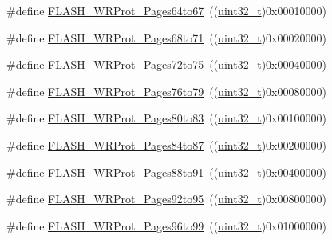 \begin{DoxyCompactItemize}
\item 
\#define \hyperlink{group___option___bytes___write___protection_ga124928d6134ddac13e3e8810a0d8dd1a}{F\+L\+A\+S\+H\+\_\+\+W\+R\+Prot\+\_\+\+Pages64to67}~((\hyperlink{_p_e___types_8h_a33594304e786b158f3fb30289278f5af}{uint32\+\_\+t})0x00010000)
\item 
\#define \hyperlink{group___option___bytes___write___protection_gafbb813885c6cd505c64083f2f88532fb}{F\+L\+A\+S\+H\+\_\+\+W\+R\+Prot\+\_\+\+Pages68to71}~((\hyperlink{_p_e___types_8h_a33594304e786b158f3fb30289278f5af}{uint32\+\_\+t})0x00020000)
\item 
\#define \hyperlink{group___option___bytes___write___protection_ga1a19c52012bbb30f3ae1599fa5a200cc}{F\+L\+A\+S\+H\+\_\+\+W\+R\+Prot\+\_\+\+Pages72to75}~((\hyperlink{_p_e___types_8h_a33594304e786b158f3fb30289278f5af}{uint32\+\_\+t})0x00040000)
\item 
\#define \hyperlink{group___option___bytes___write___protection_ga9e1f9abfa57766312c6cbae9b42f3ab6}{F\+L\+A\+S\+H\+\_\+\+W\+R\+Prot\+\_\+\+Pages76to79}~((\hyperlink{_p_e___types_8h_a33594304e786b158f3fb30289278f5af}{uint32\+\_\+t})0x00080000)
\item 
\#define \hyperlink{group___option___bytes___write___protection_ga5749428874f99f77a5c5fc48a88816d9}{F\+L\+A\+S\+H\+\_\+\+W\+R\+Prot\+\_\+\+Pages80to83}~((\hyperlink{_p_e___types_8h_a33594304e786b158f3fb30289278f5af}{uint32\+\_\+t})0x00100000)
\item 
\#define \hyperlink{group___option___bytes___write___protection_ga9dbf7aeb5b54b42f9b345c95d00eaf32}{F\+L\+A\+S\+H\+\_\+\+W\+R\+Prot\+\_\+\+Pages84to87}~((\hyperlink{_p_e___types_8h_a33594304e786b158f3fb30289278f5af}{uint32\+\_\+t})0x00200000)
\item 
\#define \hyperlink{group___option___bytes___write___protection_gaeece6aa5e198239067c47f678b9d015e}{F\+L\+A\+S\+H\+\_\+\+W\+R\+Prot\+\_\+\+Pages88to91}~((\hyperlink{_p_e___types_8h_a33594304e786b158f3fb30289278f5af}{uint32\+\_\+t})0x00400000)
\item 
\#define \hyperlink{group___option___bytes___write___protection_gab7d95c1f574523ef827bafd01a64b0bb}{F\+L\+A\+S\+H\+\_\+\+W\+R\+Prot\+\_\+\+Pages92to95}~((\hyperlink{_p_e___types_8h_a33594304e786b158f3fb30289278f5af}{uint32\+\_\+t})0x00800000)
\item 
\#define \hyperlink{group___option___bytes___write___protection_ga8f3ea488c33b3e209cab996545f55c49}{F\+L\+A\+S\+H\+\_\+\+W\+R\+Prot\+\_\+\+Pages96to99}~((\hyperlink{_p_e___types_8h_a33594304e786b158f3fb30289278f5af}{uint32\+\_\+t})0x01000000)

\end{DoxyCompactItemize}
